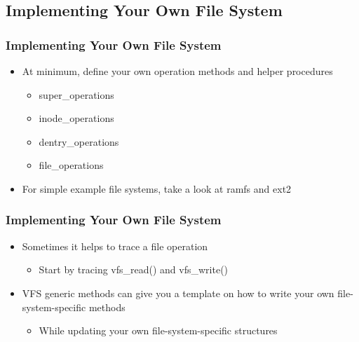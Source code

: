 \subsection{Implementing Your Own File System}

% 
\begin{frame}[fragile]
    \frametitle{Implementing Your Own File System}


    \begin{itemize}
        \item At minimum, define your own operation methods and helper procedures
	    \begin{itemize}
	        \item super\_operations 
	        \item inode\_operations 
          \item dentry\_operations 
          \item file\_operations
      \end{itemize}
        \item For simple example file systems, take a look at ramfs and ext2
    \end{itemize}
% 
\end{frame}
\begin{frame}[fragile]
    \frametitle{Implementing Your Own File System}


    \begin{itemize}
        \item Sometimes it helps to trace a file operation
      \begin{itemize}
          \item Start by tracing vfs\_read() and vfs\_write()
      \end{itemize}
        \item VFS generic methods can give you a template on how to write your own file-system-specific methods
	    \begin{itemize}
	        \item While updating your own file-system-specific structures
      \end{itemize}
    \end{itemize}
% 
\end{frame}

